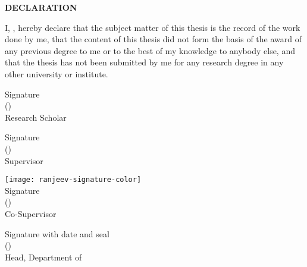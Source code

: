 \begin{titlepage}
    \begin{center}
        {\bf \large DECLARATION}
    \end{center}
    
    \par
    I, \textit{\authorname}, hereby declare that the subject matter of this thesis is the record of the work done by me, that the content of this thesis did not form the basis of the award of any previous degree to me or to the best of my knowledge to anybody else, and that the thesis has not been submitted by me for any research degree in any other university or institute.
    
    \vspace*{18mm}
    \begin{flushleft}
        Signature\\
        (\authorname)\\
        Research Scholar
    \end{flushleft}
    
    \vspace*{18mm}
    \begin{flushleft}
        Signature\\
        (\supervisor)\\
        Supervisor
    \end{flushleft}
    
    \vspace*{8mm}
    \begin{flushleft}
    	\texttt{[image: ranjeev-signature-color]}\vspace{-3mm}\\
        Signature\\
        (\cosupervisor)\\
        Co-Supervisor
    \end{flushleft}
    
    \vspace*{18mm}
    \begin{flushleft}
        Signature with date and seal\\
        (\headofdepartment)\\
        Head, Department of \department
    \end{flushleft}
\end{titlepage}